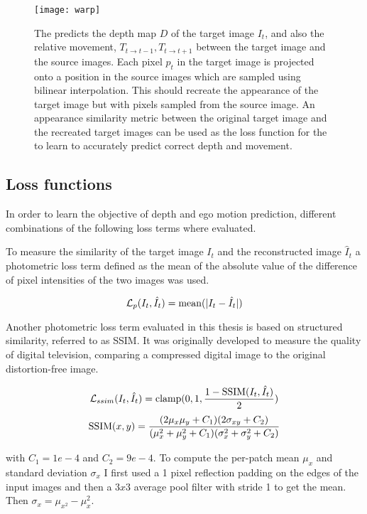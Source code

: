 \begin{figure}[H]
	\centering
	\texttt{[image: warp]}
	\caption{The \abbrCNN predicts the depth map $D$ of the target image $I_t$, and also the relative movement, $T_{t\rightarrow t-1}, T_{t\rightarrow t+1}$ between the target image and the source images. Each pixel $p_t$ in the target image is projected onto a position in the source images which are sampled using bilinear interpolation. This should recreate the appearance of the target image but with pixels sampled from the source image. An appearance similarity metric between the original target image and the recreated target images can be used as the loss function for the \abbrCNN to learn to accurately predict correct depth and movement.}
	\label{fig:warp}
\end{figure}



\subsection{Loss functions}
\label{sec:loss}

In order to learn the objective of depth and ego motion prediction, different combinations of the following loss terms where evaluated.

To measure the similarity of the target image $I_t$ and the reconstructed image $\hat{I}_t$ a photometric loss term defined as the mean of the absolute value of the difference of pixel intensities of the two images was used.

\[
\mathcal{L}_p(I_t, \hat{I}_t)=\operatorname{mean}(|I_t - \hat{I}_t|)
\]

Another photometric loss term evaluated in this thesis is based on structured similarity, referred to as SSIM\cite{ssim}. It was originally developed to measure the quality of digital television, comparing a compressed digital image to the original distortion-free image.

\[
\mathcal{L}_{ssim}(I_t, \hat{I}_t)=\operatorname{clamp}(0,1,\dfrac{1-\operatorname{SSIM}(I_t, \hat{I}_t)}{2})
\]
\[
\operatorname{SSIM}(x,y)=\frac{(2\mu_x\mu_y+C_1)(2\sigma_{xy}+C_2)}{(\mu_x^2+\mu_y^2+C_1)(\sigma_x^2+\sigma_y^2+C_2)}
\]

with $C_1=1e-4$ and $C_2=9e-4$. To compute the per-patch mean $\mu_x$ and standard deviation $\sigma_x$ I first used a 1 pixel reflection padding on the edges of the input images and then a $3x3$ average pool filter with stride 1 to get the mean. Then $ \sigma_x=\mu_{x^2}-\mu_x^2 $.

